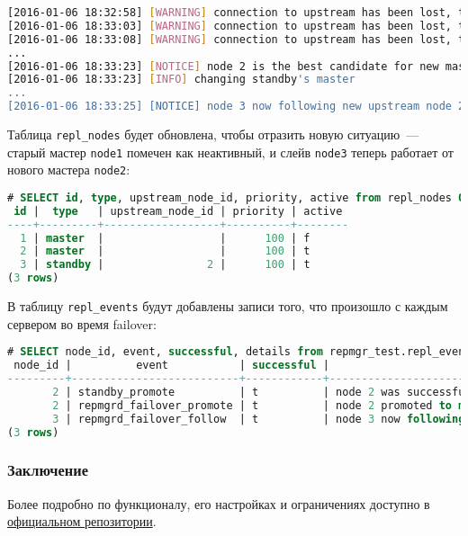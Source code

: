 \begin{lstlisting}[language=Bash,label=lst:repmgr7,caption=Переключение слейва на новый мастер]
[2016-01-06 18:32:58] [WARNING] connection to upstream has been lost, trying to recover... 15 seconds before failover decision
[2016-01-06 18:33:03] [WARNING] connection to upstream has been lost, trying to recover... 10 seconds before failover decision
[2016-01-06 18:33:08] [WARNING] connection to upstream has been lost, trying to recover... 5 seconds before failover decision
...
[2016-01-06 18:33:23] [NOTICE] node 2 is the best candidate for new master, attempting to follow...
[2016-01-06 18:33:23] [INFO] changing standby's master
...
[2016-01-06 18:33:25] [NOTICE] node 3 now following new upstream node 2
\end{lstlisting}

Таблица \lstinline!repl_nodes! будет обновлена, чтобы отразить новую ситуацию~--- старый мастер \lstinline!node1! помечен как неактивный, и слейв \lstinline!node3! теперь работает от нового мастера \lstinline!node2!:

\begin{lstlisting}[language=SQL,label=lst:repmgr8,caption=Результат после failover]
# SELECT id, type, upstream_node_id, priority, active from repl_nodes ORDER BY id;
 id |  type   | upstream_node_id | priority | active
----+---------+------------------+----------+--------
  1 | master  |                  |      100 | f
  2 | master  |                  |      100 | t
  3 | standby |                2 |      100 | t
(3 rows)
\end{lstlisting}

В таблицу \lstinline!repl_events! будут добавлены записи того, что произошло с каждым сервером во время failover:

\begin{lstlisting}[language=SQL,label=lst:repmgr9,caption=Результат после failover]
# SELECT node_id, event, successful, details from repmgr_test.repl_events where event_timestamp>='2016-01-06 18:30';
 node_id |          event           | successful |                         details
---------+--------------------------+------------+----------------------------------------------------------
       2 | standby_promote          | t          | node 2 was successfully promoted to master
       2 | repmgrd_failover_promote | t          | node 2 promoted to master; old master 1 marked as failed
       3 | repmgrd_failover_follow  | t          | node 3 now following new upstream node 2
(3 rows)
\end{lstlisting}

\subsubsection{Заключение}

Более подробно по функционалу, его настройках и ограничениях доступно в \href{https://github.com/2ndQuadrant/repmgr/blob/master/README.md}{официальном репозитории}.
